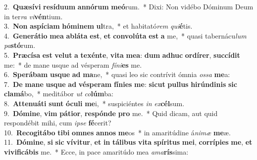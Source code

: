 {2.~}\textbf{Quæ}\textbf{sí}\textbf{vi} \textbf{re}\textbf{sí}\textbf{du}\textbf{um} \textbf{an}\textbf{nó}\textbf{rum} \textbf{me}\textbf{ó}rum.~* Dixi: Non vidébo Dóminum Deum in ter\textit{ra} \textit{vi}\textbf{vén}tium.\\
{3.~}\textbf{Non} \textbf{a}\textbf{spí}\textbf{ci}\textbf{am} \textbf{hó}\textbf{mi}\textbf{nem} \textbf{ul}tra,~* et habitató\textit{rem} \textit{qui}\textbf{é}tis.\\
{4.~}\textbf{Ge}\textbf{ne}\textbf{rá}\textbf{ti}\textbf{o} \textbf{me}\textbf{a} \textbf{a}\textbf{blá}\textbf{ta} \textbf{est}, \textbf{et} \textbf{con}\textbf{vo}\textbf{lú}\textbf{ta} \textbf{est} \textbf{a} me,~* quasi tabernácu\textit{lum} \textit{pa}\textbf{stó}rum.\\
{5.~}\textbf{Præ}\textbf{cí}\textbf{sa} \textbf{est} \textbf{ve}\textbf{lut} \textbf{a} \textbf{te}\textbf{xén}\textbf{te}, \textbf{vi}\textbf{ta} \textbf{me}\textbf{a}: \textbf{dum} \textbf{a}\textbf{dhuc} \textbf{or}\textbf{dí}\textbf{rer}, \textbf{suc}\textbf{cí}\textbf{dit} me:~* de mane usque ad vésperam \textit{fí}\textit{ni}\textbf{es} me.\\
{6.~}\textbf{Spe}\textbf{rá}\textbf{bam} \textbf{us}\textbf{que} \textbf{ad} \textbf{ma}ne,~* quasi leo sic contrívit ómnia \textit{os}\textit{sa} \textbf{me}a:\\
{7.~}\textbf{De} \textbf{ma}\textbf{ne} \textbf{us}\textbf{que} \textbf{ad} \textbf{vé}\textbf{spe}\textbf{ram} \textbf{fí}\textbf{ni}\textbf{es} \textbf{me}: \textbf{si}\textbf{cut} \textbf{pul}\textbf{lus} \textbf{hi}\textbf{rún}\textbf{di}\textbf{nis} \textbf{sic} \textbf{cla}\textbf{má}bo,~* meditábor \textit{ut} \textit{co}\textbf{lúm}ba:\\
{8.~}\textbf{At}\textbf{te}\textbf{nu}\textbf{á}\textbf{ti} \textbf{sunt} \textbf{ó}\textbf{cu}\textbf{li} \textbf{me}i,~* suspiciéntes \textit{in} \textit{ex}\textbf{cél}sum.\\
{9.~}\textbf{Dó}\textbf{mi}\textbf{ne}, \textbf{vim} \textbf{pá}\textbf{ti}\textbf{or}, \textbf{re}\textbf{spón}\textbf{de} \textbf{pro} me.~* Quid dicam, aut quid respondébit mihi, cum \textit{i}\textit{pse} \textbf{fé}cerit?\\
{10.~}\textbf{Re}\textbf{co}\textbf{gi}\textbf{tá}\textbf{bo} \textbf{ti}\textbf{bi} \textbf{om}\textbf{nes} \textbf{an}\textbf{nos} \textbf{me}os~* in amaritúdine á\textit{ni}\textit{mæ} \textbf{me}æ.\\
{11.~}\textbf{Dó}\textbf{mi}\textbf{ne}, \textbf{si} \textbf{sic} \textbf{ví}\textbf{vi}\textbf{tur}, \textbf{et} \textbf{in} \textbf{tá}\textbf{li}\textbf{bus} \textbf{vi}\textbf{ta} \textbf{spí}\textbf{ri}\textbf{tus} \textbf{me}\textbf{i}, \textbf{cor}\textbf{rí}\textbf{pi}\textbf{es} \textbf{me}, \textbf{et} \textbf{vi}\textbf{vi}\textbf{fi}\textbf{cá}\textbf{bis} me.~* Ecce, in pace amaritúdo mea \textit{a}\textit{ma}\textbf{rís}sima:\\
